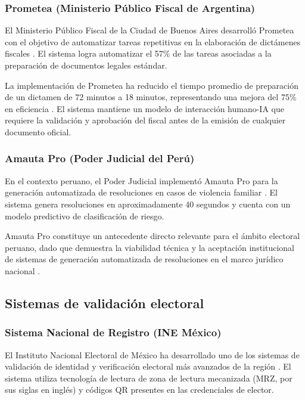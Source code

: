 \documentclass[12pt,a4paper,oneside]{book}
\begin{document}
\subsubsection{Prometea (Ministerio Público Fiscal de Argentina)}

El Ministerio Público Fiscal de la Ciudad de Buenos Aires desarrolló Prometea con el objetivo de automatizar tareas repetitivas en la elaboración de dictámenes fiscales \cite{bid2020prometea}. El sistema logra automatizar el 57\% de las tareas asociadas a la preparación de documentos legales estándar.

La implementación de Prometea ha reducido el tiempo promedio de preparación de un dictamen de 72 minutos a 18 minutos, representando una mejora del 75\% en eficiencia \cite{bid2020prometea}. El sistema mantiene un modelo de interacción humano-IA que requiere la validación y aprobación del fiscal antes de la emisión de cualquier documento oficial.

\subsubsection{Amauta Pro (Poder Judicial del Perú)}

En el contexto peruano, el Poder Judicial implementó Amauta Pro para la generación automatizada de resoluciones en casos de violencia familiar \cite{pj2023amauta}. El sistema genera resoluciones en aproximadamente 40 segundos y cuenta con un modelo predictivo de clasificación de riesgo.

Amauta Pro constituye un antecedente directo relevante para el ámbito electoral peruano, dado que demuestra la viabilidad técnica y la aceptación institucional de sistemas de generación automatizada de resoluciones en el marco jurídico nacional \cite{pj2023amauta}.

\subsection{Sistemas de validación electoral}

\subsubsection{Sistema Nacional de Registro (INE México)}

El Instituto Nacional Electoral de México ha desarrollado uno de los sistemas de validación de identidad y verificación electoral más avanzados de la región \cite{ine2022registro}. El sistema utiliza tecnología de lectura de zona de lectura mecanizada (MRZ, por sus siglas en inglés) y códigos QR presentes en las credenciales de elector.
\end{document}
